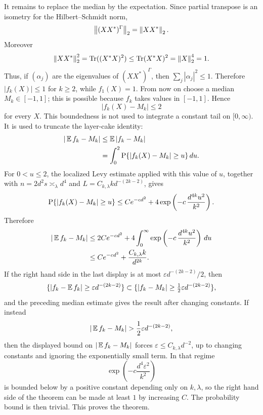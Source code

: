 It remains to replace the median by the expectation.  Since partial
transpose is an isometry for the Hilbert--Schmidt norm,
\[
  \left\lVert(XX^*)^\Gamma\right\rVert_2=\left\lVert XX^*\right\rVert_2.
\]
Moreover
\[
  \left\lVert XX^*\right\rVert_2^2=\operatorname{Tr}((X^*X)^2)
  \le \operatorname{Tr}(X^*X)^2=\left\lVert X\right\rVert_2^4=1.
\]
Thus, if \((\alpha_j)\) are the eigenvalues of \((XX^*)^\Gamma\), then
\(\sum_j|\alpha_j|^2\le1\).  Therefore \(|f_k(X)|\le1\) for \(k\ge2\),
while \(f_1(X)=1\).  From now on choose a median \(M_k\in[-1,1]\); this is
possible because \(f_k\) takes values in \([-1,1]\).  Hence
\[
  |f_k(X)-M_k|\le2
\]
for every \(X\).  This boundedness is not used to integrate a constant tail
on \([0,\infty)\).  It is used to truncate the layer-cake identity:
\[
\begin{aligned}
  |\operatorname{\mathbb{E}} f_k-M_k|
  &\le \operatorname{\mathbb{E}} |f_k-M_k|                                      \\
  &=\int_0^2
      \operatorname{P}\{|f_k(X)-M_k|\ge u\}\,du .
\end{aligned}
\]
For \(0<u\le2\), the localized Levy estimate applied with this value of
\(u\), together with \(n=2d^2s\asymp_\lambda d^4\) and
\(L=C_{k,\lambda}k d^{-(2k-2)}\), gives
\[
  \operatorname{P}\{|f_k(X)-M_k|\ge u\}
  \le
  C e^{-c d^2}
  +
  4\exp\left(-c\,\frac{d^{4k}u^2}{k^2}\right).
\]
Therefore
\[
\begin{aligned}
  |\operatorname{\mathbb{E}} f_k-M_k|
  &\le
  2C e^{-c d^2}
  +
  4\int_0^\infty
    \exp\left(-c\,\frac{d^{4k}u^2}{k^2}\right)\,du        \\
  &\le
  C e^{-c d^2}+\frac{C_{k,\lambda}k}{d^{2k}} .
\end{aligned}
\]
If the right hand side in the last display is at most
\(\varepsilon d^{-(2k-2)}/2\), then
\[
  \{|f_k-\operatorname{\mathbb{E}} f_k|\ge\varepsilon d^{-(2k-2)}\}
  \subset
  \{|f_k-M_k|\ge\tfrac12\varepsilon d^{-(2k-2)}\},
\]
and the preceding median estimate gives the result after changing constants.
If instead
\[
  |\E f_k-M_k|>\frac12\varepsilon d^{-(2k-2)},
\]
then the displayed bound on \(|\operatorname{\mathbb{E}} f_k-M_k|\) forces
\(\varepsilon\le C_{k,\lambda}d^{-2}\), up to changing constants and ignoring
the exponentially small term.  In that regime
\[
  \exp\left(-c\frac{d^4\varepsilon^2}{k^2}\right)
\]
is bounded below by a positive constant depending only on \(k,\lambda\), so
the right hand side of the theorem can be made at least \(1\) by increasing
\(C\).  The probability bound is then trivial.  This proves the theorem.
